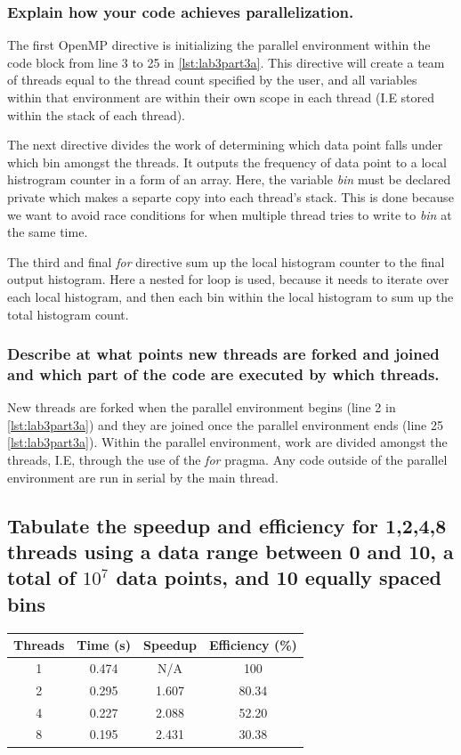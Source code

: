 \subsubsection{Explain how your code achieves parallelization.}

The first OpenMP directive is initializing the parallel environment
within the code block from line 3 to 25 in \cref{lst:lab3part3a}. This
directive will create a team of threads equal to the thread count specified
by the user, and all variables within that environment are within their own
scope in each thread (I.E stored within the stack of each thread).

The next directive divides the work of determining which data point falls
under which bin amongst the threads. It outputs the frequency of data point 
to a local histrogram counter in a form of an array. Here, the variable \emph{bin} must be 
declared private which makes a separte copy into each thread's stack. This is
done because we want to avoid race conditions for when multiple thread tries
to write to \emph{bin} at the same time.

The third and final \emph{for} directive sum up the local histogram counter
to the final output histogram. Here a nested for loop is used, because it needs
to iterate over each local histogram, and then each bin within the local histogram
to sum up the total histogram count.

\subsubsection{Describe at what points new threads are forked and joined and
which part of the code are executed by which threads.}

New threads are forked when the parallel environment begins (line 2 in 
\cref{lst:lab3part3a}) and they are joined once the parallel environment ends
(line 25 \cref{lst:lab3part3a}). Within the parallel environment, work
are divided amongst the threads, I.E, through the use of the \emph{for} pragma.
Any code outside of the parallel environment are run in serial by the main thread.

\subsection{Tabulate the speedup and efficiency for 1,2,4,8 threads using a data
range between 0 and 10, a total of $10^7$ data points, and 10 equally spaced bins}

\begin{center}
\begin{tabular}{|| c | c | c | c ||}
	\hline
	Threads & Time (s) & Speedup & Efficiency (\%) \\ [0.5ex]
	\hline 
	1 & 0.474 & N/A & 100 \\
	2 & 0.295 & 1.607 & 80.34 \\
	4 & 0.227 & 2.088 & 52.20 \\
	8 & 0.195 & 2.431 & 30.38\\
	\hline
\end{tabular}
\end{center}

